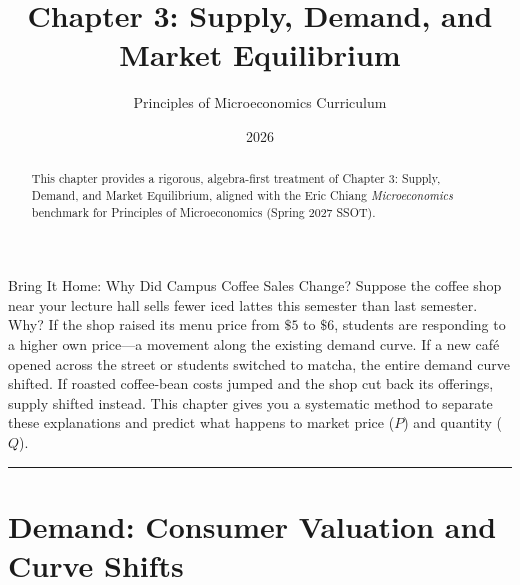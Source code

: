 \documentclass[11pt,letterpaper]{article}
\begin{document}
\title{\Huge\bfseries\color{SlateBlue} Chapter 3: Supply, Demand, and Market Equilibrium}
\author{\large Principles of Microeconomics Curriculum}
\date{2026}
\maketitle

\thispagestyle{plain}

\begin{abstract}
This chapter provides a rigorous, algebra-first treatment of Chapter 3: Supply, Demand, and Market Equilibrium, aligned with the Eric Chiang \emph{Microeconomics} benchmark for Principles of Microeconomics (Spring 2027 SSOT).
\end{abstract}

\begin{examplecase}{Bring It Home: Why Did Campus Coffee Sales Change?}
Suppose the coffee shop near your lecture hall sells fewer iced lattes this semester than last semester. Why? If the shop raised its menu price from $\$5$ to $\$6$, students are responding to a higher own price—a movement along the existing demand curve. If a new café opened across the street or students switched to matcha, the entire demand curve shifted. If roasted coffee-bean costs jumped and the shop cut back its offerings, supply shifted instead. This chapter gives you a systematic method to separate these explanations and predict what happens to market price ($P$) and quantity ($Q$).
\end{examplecase}

\tableofcontents
\vspace{1.5em}
\hrule
\vspace{1.5em}

\section{Demand: Consumer Valuation and Curve Shifts}
\end{document}
